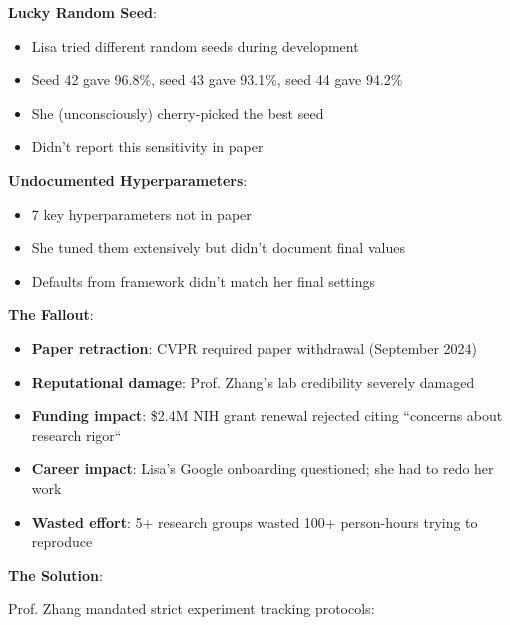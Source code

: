 \textbf{Lucky Random Seed}:
\begin{itemize}
    \item Lisa tried different random seeds during development
    \item Seed 42 gave 96.8\%, seed 43 gave 93.1\%, seed 44 gave 94.2\%
    \item She (unconsciously) cherry-picked the best seed
    \item Didn't report this sensitivity in paper
\end{itemize}

\textbf{Undocumented Hyperparameters}:
\begin{itemize}
    \item 7 key hyperparameters not in paper
    \item She tuned them extensively but didn't document final values
    \item Defaults from framework didn't match her final settings
\end{itemize}

\textbf{The Fallout}:

\begin{itemize}
    \item \textbf{Paper retraction}: CVPR required paper withdrawal (September 2024)
    \item \textbf{Reputational damage}: Prof. Zhang's lab credibility severely damaged
    \item \textbf{Funding impact}: \$2.4M NIH grant renewal rejected citing ``concerns about research rigor``
    \item \textbf{Career impact}: Lisa's Google onboarding questioned; she had to redo her work
    \item \textbf{Wasted effort}: 5+ research groups wasted 100+ person-hours trying to reproduce
\end{itemize}

\textbf{The Solution}:

Prof. Zhang mandated strict experiment tracking protocols:

